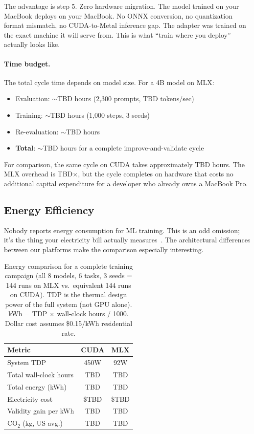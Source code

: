 \documentclass[11pt]{article}
\begin{document}
The advantage is step 5.  Zero hardware migration.  The model trained on your MacBook deploys on your MacBook.  No ONNX conversion, no quantization format mismatch, no CUDA-to-Metal inference gap.  The adapter was trained on the exact machine it will serve from.  This is what ``train where you deploy'' actually looks like.

\paragraph{Time budget.} The total cycle time depends on model size.  For a 4B model on MLX:
\begin{itemize}[leftmargin=*]
\item Evaluation: $\sim$TBD hours (2{,}300 prompts, TBD tokens/sec)
\item Training: $\sim$TBD hours (1{,}000 steps, 3 seeds)
\item Re-evaluation: $\sim$TBD hours
\item \textbf{Total}: $\sim$TBD hours for a complete improve-and-validate cycle
\end{itemize}

For comparison, the same cycle on CUDA takes approximately TBD hours.  The MLX overhead is TBD$\times$, but the cycle completes on hardware that costs no additional capital expenditure for a developer who already owns a MacBook Pro.

\subsection{Energy Efficiency}
\label{sec:energy}

Nobody reports energy consumption for ML training.  This is an odd omission; it's the thing your electricity bill actually measures~\citep{strubell2019energy, patterson2021carbon}.  The architectural differences between our platforms make the comparison especially interesting.

\begin{table}[t]
\centering
\caption{Energy comparison for a complete training campaign (all 8 models, 6 tasks, 3 seeds = 144 runs on MLX vs.\ equivalent 144 runs on CUDA).  TDP is the thermal design power of the full system (not GPU alone).  kWh = TDP $\times$ wall-clock hours / 1000.  Dollar cost assumes \$0.15/kWh residential rate.}
\label{tab:energy}
\begin{tabular}{l cc}
\toprule
\textbf{Metric} & \textbf{CUDA} & \textbf{MLX} \\
\midrule
System TDP & 450W & 92W \\
Total wall-clock hours & TBD & TBD \\
Total energy (kWh) & TBD & TBD \\
Electricity cost & \$TBD & \$TBD \\
Validity gain per kWh & TBD & TBD \\
CO$_2$ (kg, US avg.) & TBD & TBD \\
\bottomrule
\end{tabular}
\end{table}
\end{document}
